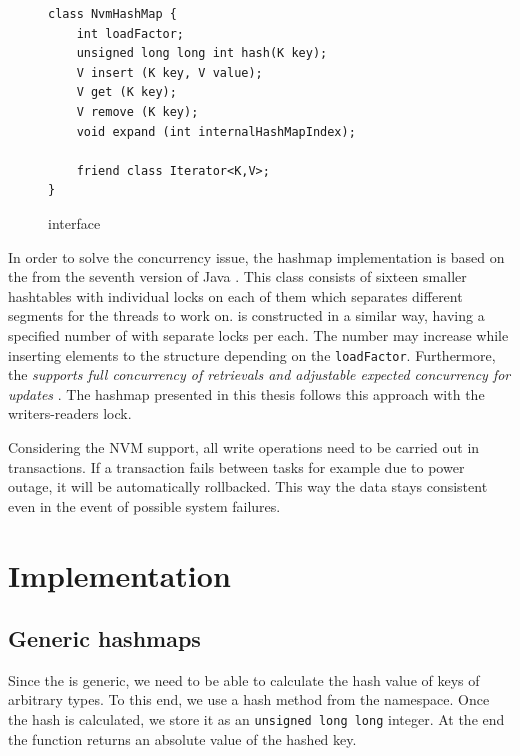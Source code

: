 \begin{figure}[ht] 
\renewcommand{\figurename}{Listing}
    \begin{lstlisting}
class NvmHashMap {
    int loadFactor;
    unsigned long long int hash(K key);
    V insert (K key, V value);
    V get (K key);
    V remove (K key);
    void expand (int internalHashMapIndex);
    
    friend class Iterator<K,V>;
}
    \end{lstlisting}
\label{NvmHashMap}
\caption{\NvmHashMap interface}
\end{figure}
    In order to solve the concurrency issue, the hashmap implementation is based on the \ConcurrentHashMap from the seventh version of Java \cite{ConcurrentHashMapJava}. 
    This class consists of sixteen smaller hashtables with individual locks on each of them which separates different segments for the threads to work on.
    \NvmHashMap is constructed in a similar way, having a specified number of \internalHashMaps with separate locks per each.
    The number may increase while inserting elements to the structure depending on the \texttt{loadFactor}.
    Furthermore, the \ConcurrentHashMap \textit{supports full concurrency of retrievals and adjustable expected concurrency for updates} \cite{ConcurrentHashMapJava}. 
    The hashmap presented in this thesis follows this approach with the writers-readers lock.
    
    Considering the NVM support, all write operations need to be carried out in transactions. 
    If a transaction fails between tasks for example due to power outage, it will be automatically rollbacked.
    This way the data stays consistent even in the event of possible system failures.

\section{Implementation}

    \subsection{Generic hashmaps} 
        Since the \NvmHashMap is generic, we need to be able to calculate the hash value of keys of arbitrary types. 
        To this end, we use a hash method from the \std namespace. 
        Once the hash is calculated, we store it as an \texttt{unsigned long long} integer.
        At the end the function returns an absolute value of the hashed key.
        
